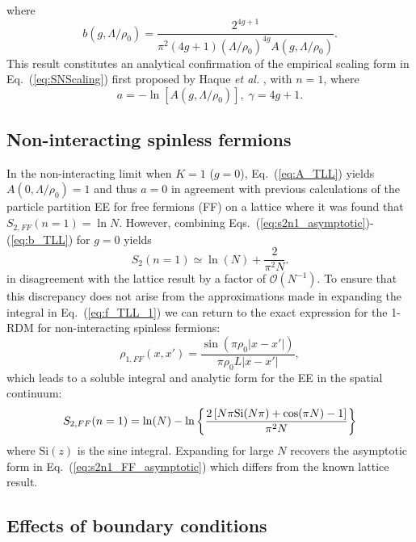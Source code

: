 %
where
% 
\begin{equation}
b(g,\Lambda/\rho_0)=\frac{2^{4 g+1}}{\pi ^2 (4 g+1)(\Lambda/\rho_0)^{4g}
A(g,\Lambda/\rho_0)}.
\label{eq:b_TLL} 
\end{equation}
%
This result constitutes an analytical confirmation of the empirical scaling
form in Eq.~(\ref{eq:SNScaling}) first proposed by Haque \emph{et al.}
\cite{Zozulya:2008kb,Haque:2009df}, with $n=1$, where  
%
\begin{equation}
a=-\ln\left[A(g,\Lambda/\rho_0)\right],\; \gamma=4g+1.
\label{eq:TLL_a1_gamma}
\end{equation}
%

\subsection{Non-interacting spinless fermions}

In the non-interacting limit when $K=1$ ($g=0$), Eq.~(\ref{eq:A_TLL}) yields
$A(0,\Lambda/\rho_0)=1$ and thus $a=0$ in agreement with previous calculations
of the particle partition EE for free fermions (FF) on a lattice
\cite{Zozulya:2008kb} where it was found that $S_{2,{FF}}(n=1) = \ln N$.
However, combining Eqs.~(\ref{eq:s2n1_asymptotic})-(\ref{eq:b_TLL}) for $g=0$
yields 
%
\begin{equation}
S_{2}(n=1)\simeq\ln(N)+\frac{2}{\pi^2N}.
\label{eq:s2n1_FF_asymptotic}
\end{equation}
%
in disagreement with the lattice result by a factor of $\mathcal{O}(N^{-1})$.  To
ensure that this discrepancy does not arise from the approximations made in
expanding the integral in Eq.~(\ref{eq:f_TLL_1}) we can return to the exact expression for the
1-RDM for non-interacting spinless fermions:
%
\begin{equation}
\rho_{1,FF}\left(x,x'\right)=\frac{\sin(\pi \rho_0|x-x'|)}{\pi \rho_0L|x-x'|},\label{eq:FFOBDM}
\end{equation}
%
which leads to a soluble integral and analytic form for the EE in the spatial
continuum:
%
\begin{equation}
    S_{2,FF}(n=1)=\ln(N)-\ln\left\{\frac{2 \left[N \pi {\rm{Si}}(N \pi )+\cos (\pi
    N)-1\right]}{\pi ^2 N}\right\}
\label{eq:s2n1_FF}
\end{equation}
%
where $\mathrm{Si}(z)$ is the sine integral.  Expanding for large $N$ recovers
the asymptotic form in Eq.~(\ref{eq:s2n1_FF_asymptotic}) which differs from the
known lattice result.

\subsection{Effects of boundary conditions}

